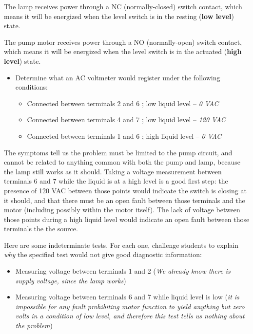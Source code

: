 







The lamp receives power through a NC (normally-closed) switch contact, which means it will be energized when the level switch is in the resting ({\bf low level}) state.

\vskip 10pt

The pump motor receives power through a NO (normally-open) switch contact, which means it will be energized when the level switch is in the actuated ({\bf high level}) state.

\begin{itemize}
\item{} Determine what an AC voltmeter would register under the following conditions:
\begin{itemize}

\item{} Connected between terminals 2 and 6 ; low liquid level -- {\it 0 VAC}
\item{} Connected between terminals 4 and 7 ; low liquid level -- {\it 120 VAC}
\item{} Connected between terminals 1 and 6 ; high liquid level -- {\it 0 VAC}
\end{itemize}
\end{itemize}

\vskip 10pt

The symptoms tell us the problem must be limited to the pump circuit, and cannot be related to anything common with both the pump and lamp, because the lamp still works as it should.  Taking a voltage measurement between terminals 6 and 7 while the liquid is at a high level is a good first step: the presence of 120 VAC between those points would indicate the switch is closing at it should, and that there must be an open fault between those terminals and the motor (including possibly within the motor itself).  The lack of voltage between those points during a high liquid level would indicate an open fault between those terminals the the source.

\vskip 10pt

Here are some indeterminate tests.  For each one, challenge students to explain {\it why} the specified test would not give good diagnostic information:

\begin{itemize}
\item{} Measuring voltage between terminals 1 and 2 ({\it We already know there is supply voltage, since the lamp works})
\vskip 5pt
\item{} Measuring voltage between terminals 6 and 7 while liquid level is low ({\it it is impossible for any fault prohibiting motor function to yield anything but zero volts in a condition of low level, and therefore this test tells us nothing about the problem})
\end{itemize}





